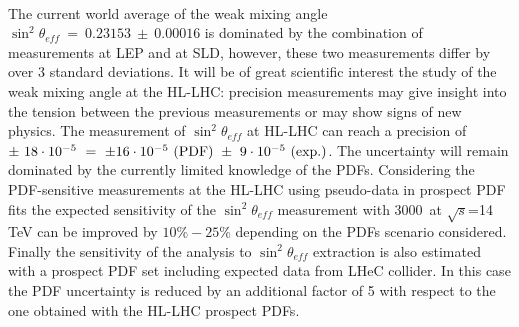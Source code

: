 \documentclass{article}
\begin{document}
\\

The current world average of the weak mixing angle $\sin^2\theta_{eff}~=~0.23153~\pm~0.00016$ is dominated by the combination of measurements at LEP and at SLD, however, these two measurements differ by over 3 standard deviations. It will be of great scientific interest the study of the weak mixing angle at the HL-LHC: precision measurements may give insight into the tension between the previous measurements or may show signs of new physics. The measurement of $\sin^2\theta_{eff}$ at HL-LHC can reach a precision of $\pm~ 18 \cdot 10^{-5} ~= ~\pm 16 \cdot 10^{-5} ~({\rm PDF}) ~\pm~ 9 \cdot 10^{-5} ~({\rm exp.})$. The uncertainty will remain dominated by the currently limited knowledge of the PDFs. Considering the PDF-sensitive measurements at the HL-LHC using pseudo-data in prospect PDF fits the expected sensitivity of the
$\sin^2\theta_{eff}$ measurement with 3000~\ifb at
$\sqrt{s}$=14 TeV can be improved by $10\% - 25\%$ depending on the PDFs scenario considered.
Finally the sensitivity of the analysis to $\sin^2\theta_{eff}$ extraction is also estimated with a prospect PDF set including expected data from LHeC collider. In this case the PDF uncertainty is reduced by an additional factor of 5 with respect to the one obtained with the HL-LHC prospect PDFs.

\\
\end{document}
